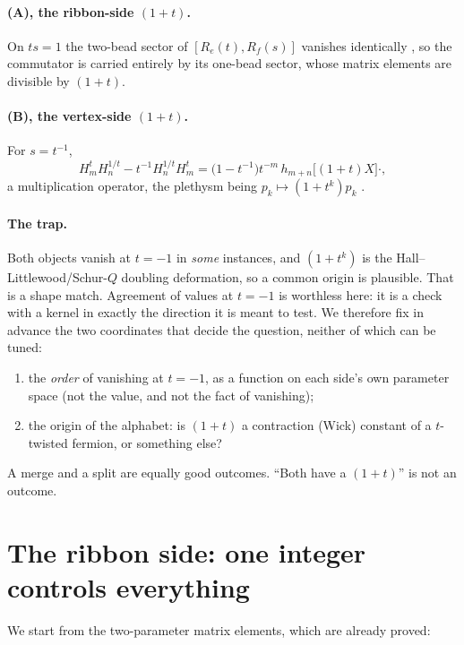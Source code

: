 \documentclass[11pt]{article}
\theoremstyle{definition}
\newcommand{\Hop}{H}
\begin{document}
\paragraph{(A), the ribbon-side $(1+t)$.}  On $ts=1$ the two-bead sector of
$[R_e(t),R_f(s)]$ vanishes identically \cite[Cor.~4.2(iii)]{Q96}, so the commutator is
carried entirely by its one-bead sector, whose matrix elements are divisible by $(1+t)$.

\paragraph{(B), the vertex-side $(1+t)$.}  For $s=t^{-1}$,
\begin{equation}\label{eq:B}
  \Hop^{t}_m \Hop^{1/t}_n-t^{-1}\Hop^{1/t}_n \Hop^{t}_m
  =\bigl(1-t^{-1}\bigr)t^{-m}\,h_{m+n}\bigl[(1+t)X\bigr]\cdot,
\end{equation}
a multiplication operator, the plethysm being $p_k\mapsto(1+t^k)p_k$ \cite[Thm.~3.4]{Q99}.

\paragraph{The trap.}  Both objects vanish at $t=-1$ in \emph{some} instances, and
$(1+t^k)$ is the Hall--Littlewood/Schur-$Q$ doubling deformation, so a common origin is
plausible.  That is a shape match.  Agreement of values at $t=-1$ is worthless here: it is
a check with a kernel in exactly the direction it is meant to test.  We therefore fix in
advance the two coordinates that decide the question, neither of which can be tuned:
\begin{enumerate}
\item[(S1)] the \emph{order} of vanishing at $t=-1$, as a function on each side's own
parameter space (not the value, and not the fact of vanishing);
\item[(S2)] the origin of the alphabet: is $(1+t)$ a contraction (Wick) constant of a
$t$-twisted fermion, or something else?
\end{enumerate}
A merge and a split are equally good outcomes.  ``Both have a $(1+t)$'' is not an outcome.

\section{The ribbon side: one integer controls everything}

We start from the two-parameter matrix elements, which are already proved:
\end{document}
